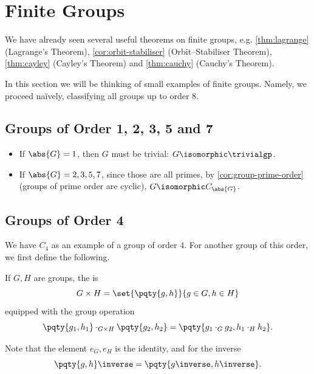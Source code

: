 \section{Finite Groups}
\label{sec:finite-groups}

We have already seen several useful theorems on finite groups, e.g. \autoref{thm:lagrange} (Lagrange's Theorem), \autoref{cor:orbit-stabiliser} (Orbit--Stabiliser Theorem), \autoref{thm:cayley} (Cayley's Theorem) and \autoref{thm:cauchy} (Cauchy's Theorem).

In this section we will be thinking of small examples of finite groups. Namely, we proceed na\"{i}vely, classifying all groups up to order \(8\).

\subsection{Groups of Order 1, 2, 3, 5 and 7}
\label{sec:groups-of-order-1-2-3-5-7}

\begin{itemize}
    \item If \(\abs{G} = 1\), then \(G\) must be trivial: \(G \isomorphic \trivialgp\).
    \item If \(\abs{G} = 2, 3, 5, 7\), since those are all primes, by \autoref{cor:group-prime-order} (groups of prime order are cyclic), \(G \isomorphic C_{\abs{G}}\).
\end{itemize}

\subsection{Groups of Order 4}
\label{sec:groups-of-order-4}

We have \(C_4\) as an example of a group of order \(4\). For another group of this order, we first define the following.

\begin{definition}
    \label{def:direct-product}%
    If \(G, H\) are groups, the  is
    \[
        G \times H = \set{\pqty{g, h}}{g \in G, h \in H}
    \]
    equipped with the group operation
    \[
        \pqty{g_1, h_1} \cdot_{G \times H} \pqty{g_2, h_2} = \pqty{g_1 \cdot_G g_2, h_1 \cdot_H h_2}.
    \]

    Note that the element \(e_G, e_H\) is the identity, and for the inverse
    \[
        \pqty{g, h}\inverse = \pqty{g\inverse, h\inverse}.
    \]
\end{definition}

